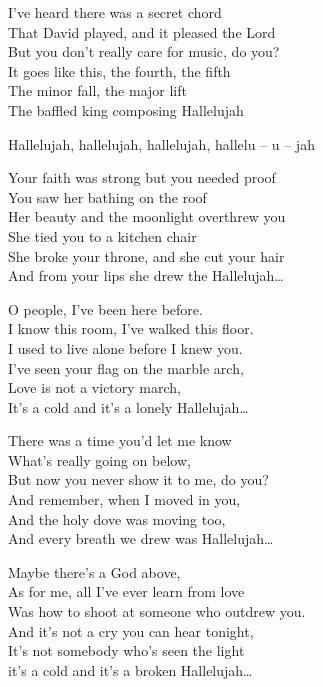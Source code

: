 
\ve{}
I've heard there was a secret chord\\
That David played, and it pleased the Lord\\
But you don't really care for music, do you? \\
It goes like this, the fourth, the fifth\\
The minor fall, the major lift\\
The baffled king composing Hallelujah

Hallelujah, hallelujah, hallelujah, hallelu -- u -- jah 

\ve{}
Your faith was strong but you needed proof\\
You saw her bathing on the roof\\
Her beauty and the moonlight overthrew you\\
She tied you to a kitchen chair\\
She broke your throne, and she cut your hair\\
And from your lips she drew the Hallelujah\ldots

\ve{}
O people, I've been here before.\\
I know this room, I've walked this floor.\\
I used to live alone before I knew you.\\
I've seen your flag on the marble arch,\\
Love is not a victory march,\\
It's a cold and it's a lonely Hallelujah\ldots

\ve{}
There was a time you'd let me know\\
What's really going on below,\\
But now you never show it to me, do you?\\
And remember, when I moved in you,\\
And the holy dove was moving too,\\
And every breath we drew was Hallelujah\ldots

\ve{}
Maybe there's a God above,\\
As for me, all I've ever learn from love\\
Was how to shoot at someone who outdrew you.\\
And it's not a cry you can hear tonight,\\
It's not somebody who's seen the light\\
it's a cold and it's a broken Hallelujah\ldots

\esong